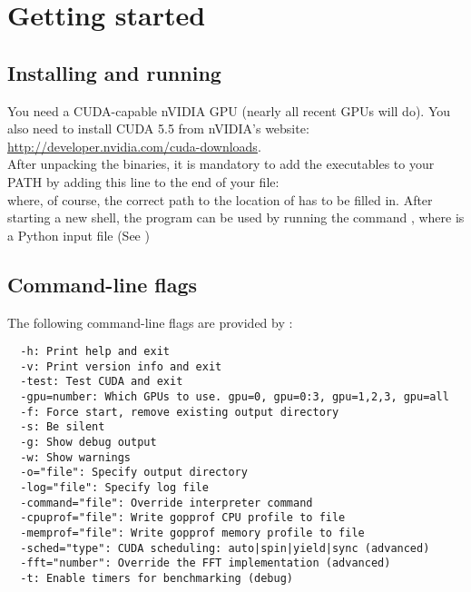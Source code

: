 \section{Getting started}

\subsection{Installing and running \mumax}

You need a CUDA-capable nVIDIA GPU (nearly all recent GPUs will do). You also need to install CUDA 5.5 from nVIDIA's website: \url{http://developer.nvidia.com/cuda-downloads}.\\

After unpacking the \mumax binaries, it is mandatory to add the \mumax executables to your PATH by adding this line to the end of your  file:\\
 where, of course, the correct path to the location of \mumax has to be filled in.  After starting a new shell, the program can be used by running the command , where  is a Python input file (See )

\subsection{Command-line flags}

The following command-line flags are provided by \mumax:
\begin{verbatim}
  -h: Print help and exit
  -v: Print version info and exit
  -test: Test CUDA and exit
  -gpu=number: Which GPUs to use. gpu=0, gpu=0:3, gpu=1,2,3, gpu=all
  -f: Force start, remove existing output directory
  -s: Be silent
  -g: Show debug output
  -w: Show warnings
  -o="file": Specify output directory
  -log="file": Specify log file
  -command="file": Override interpreter command
  -cpuprof="file": Write gopprof CPU profile to file
  -memprof="file": Write gopprof memory profile to file
  -sched="type": CUDA scheduling: auto|spin|yield|sync (advanced)
  -fft="number": Override the FFT implementation (advanced)
  -t: Enable timers for benchmarking (debug)
\end{verbatim}


